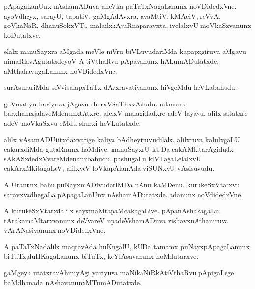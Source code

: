 \documentclass{article}
\begin{document}
\begin{mn}%
pApagaLanUnx nAshamADuva aneVka paTaTxNagaLanunx noVDidedxVne. ayoVdheyx, sarayU, tapatiV, 
gaMgAdAvxra, avaMtiV, kMAciV, reVvA, goVkaNaR, dhanuSokxVTi, malailxkAjuRnaparavxta, 
ivelalxvU moVkaSxvanunx koDutatxve.
\end{mn}

\begin{mn}%
elalx manuSayxra aMgada meVle niVru biVLuvudariMda kapapxgiruva aMgavu 
nimaRlavAgutatxdeyoV A tiVthaRvu pApavanunx hALumADutatxde. aMthahavugaLanunx noVDidedxVne.
\end{mn}

\begin{mn}%
surAsurariMda seVvisalapxTaTx dAvxravatiyanunx hiVgeMdu heVLabahudu.
\end{mn}

\begin{mn}%
goVmatiyu hariyuva jAgavu sherxVSaThxvAdudu. adanunx barxhamxjalaveMdenunxtAtxre. alelxV 
malagidadxre adeV layavu. alilx satatxre adeV moVkaSxvu eMdu shurxi heVLutatxde.
\end{mn}

\begin{mn}%
alilx vAsamADUtitxdaxvarige kaliya bAdheyiruvudilalx. alilxruva kalulxgaLU cakarxdiMda 
gutaRnunx hoMdive. manuSayxrU kUDa cakAMkitarAgidudx sAkASxdedxVvareMdenanxbahudu. 
pashugaLu kiVTagaLelalxvU cakArxMkitagaLeV, alilxyeV loVkapAlanAda viSUNxvU vAsisuvudu.
\end{mn}

\begin{mn}%
A Uranunx bahu puNayxmADivudariMDa nAnu kaMDenu. kurukeSxVtarxvu saravxvadhegaLa 
pApagaLanUnx nAshamADutatxde. adanunx noVdidedxVne.
\end{mn}

\begin{mn}%
A kurukeSxVtarxdalilx sayxmaMtapaMcakagaLive. pApanAshakagaLu. tArakamaMtarxvanunx 
deVvareV upadeVshamADuva vishavxnAthaniruva vArANasiyanunx noVDidedxVne.
\end{mn}

\begin{mn}%
A paTaTxNadalilx maqtavAda huKugalU, kUDa tamamx puNayxpApagaLanunx biTuTx,duHKagaLanunx 
biTuTx, keYlAsavanunx hoMdutarxve.
\end{mn}

\begin{mn}%
gaMgeyu utatxravAhiniyAgi yariyuva maNikaNiRkAtiVthaRvu pApigaLege baMdhanada 
nAshavanunxMTumADutatxde.
\end{mn}
\end{document}
